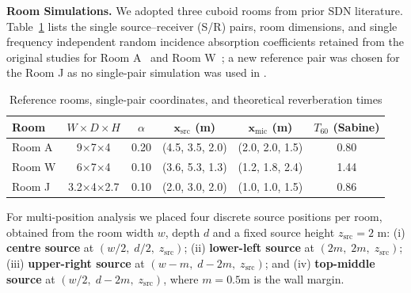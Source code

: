 \documentclass[journal]{IEEEtran}
\begin{document}
\textbf{Room Simulations.}
We adopted three cuboid rooms from prior SDN literature. 
Table~\ref{tab:rooms_single} lists the single source–receiver (S/R) pairs, room dimensions, and single frequency independent random incidence absorption coefficients retained from the original studies for Room A~\cite{SDNaes} and Room W~\cite{SDNwaspaa}; a new reference pair was chosen for the Room J as no single-pair simulation was used in \cite{SDNjournal}.

\begin{table}[h]
\setlength{\tabcolsep}{3pt} 
  \caption{Reference rooms, single-pair coordinates, and theoretical reverberation times}
  \label{tab:rooms_single}
  \centering
  \begin{tabular}{lccccc}
    \toprule
    Room & $W\!\times\!D\!\times\!H$ & $\alpha$ &
          $\mathbf x_{\mathrm{src}}$ (m) & $\mathbf x_{\mathrm{mic}}$ (m) &
          $T_{60}$ (Sabine) \\ \midrule
    Room A & 9×7×4   & 0.20 & (4.5, 3.5, 2.0) & (2.0, 2.0, 1.5) & 0.80  \\
    Room W & 6×7×4   & 0.10 & (3.6, 5.3, 1.3) & (1.2, 1.8, 2.4) & 1.44  \\
    Room J & 3.2×4×2.7 & 0.10 & (2.0, 3.0, 2.0) & (1.0, 1.0, 1.5) & 0.86 \\ \bottomrule
  \end{tabular}
\end{table}

For multi-position analysis we placed four discrete source positions per room, obtained from the room width \(w\), depth \(d\) and a fixed source height \(z_{\mathrm{src}} = 2\text{ m}\):
(i) \textbf{centre source} at \((w/2,\;d/2,\;z_{\mathrm{src}})\);
(ii) \textbf{lower-left source} at \((2m,\;2m,\;z_{\mathrm{src}})\);
(iii) \textbf{upper-right source} at \((w-m,\;d-2m,\;z_{\mathrm{src}})\);
and (iv) \textbf{top-middle source} at \((w/2,\;d-2m,\;z_{\mathrm{src}})\), where $m=0.5$m is the wall margin.
\end{document}
